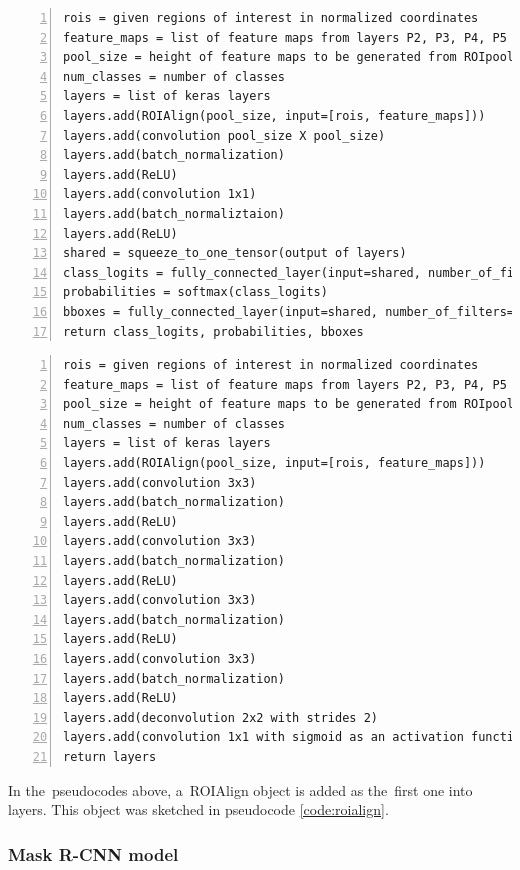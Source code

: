 {\scriptsize
\begin{lstlisting}[style=python, caption={fpn\_classifier\_graph}, captionpos=b, 
label=code:classifier, deletekeywords={from, input, map, in},
backgroundcolor = \color{light-gray}, numbers=left, breaklines=true]
rois = given regions of interest in normalized coordinates
feature_maps = list of feature maps from layers P2, P3, P4, P5
pool_size = height of feature maps to be generated from ROIpooling
num_classes = number of classes
layers = list of keras layers
layers.add(ROIAlign(pool_size, input=[rois, feature_maps]))
layers.add(convolution pool_size X pool_size)
layers.add(batch_normalization)
layers.add(ReLU)
layers.add(convolution 1x1)
layers.add(batch_normaliztaion)
layers.add(ReLU)
shared = squeeze_to_one_tensor(output of layers)
class_logits = fully_connected_layer(input=shared, number_of_filters=num_classes)
probabilities = softmax(class_logits)
bboxes = fully_connected_layer(input=shared, number_of_filters=4 * num_classes)
return class_logits, probabilities, bboxes
\end{lstlisting}}

{\scriptsize
\begin{lstlisting}[style=python, caption={build\_fpn\_maskk\_graph}, 
captionpos=b, label=code:mask, deletekeywords={from, input, map, in},
backgroundcolor = \color{light-gray}, numbers=left, breaklines=true]
rois = given regions of interest in normalized coordinates
feature_maps = list of feature maps from layers P2, P3, P4, P5
pool_size = height of feature maps to be generated from ROIpooling
num_classes = number of classes
layers = list of keras layers
layers.add(ROIAlign(pool_size, input=[rois, feature_maps]))
layers.add(convolution 3x3)
layers.add(batch_normalization)
layers.add(ReLU)
layers.add(convolution 3x3)
layers.add(batch_normalization)
layers.add(ReLU)
layers.add(convolution 3x3)
layers.add(batch_normalization)
layers.add(ReLU)
layers.add(convolution 3x3)
layers.add(batch_normalization)
layers.add(ReLU)
layers.add(deconvolution 2x2 with strides 2)
layers.add(convolution 1x1 with sigmoid as an activation function)
return layers
\end{lstlisting}}

In the~pseudocodes above, a~ROIAlign object is added as the~first one into 
layers. This object was sketched in pseudocode \ref{code:roialign}.

\subsubsection{Mask R-CNN model}
\label{model-mrcnn}

